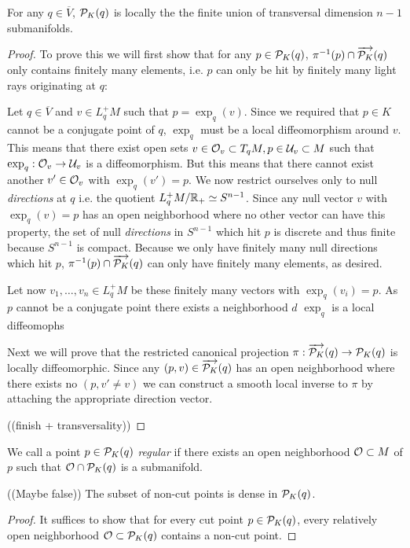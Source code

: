 \begin{proposition}
For any $q\in \overline{V}$, $\mathcal{P}_K(q)$ is locally the the finite union of transversal dimension $n-1$ submanifolds.
\end{proposition}
\begin{proof}
To prove this we will first show that for any $p\in \mathcal{P}_K(q)$, $\pi^{-1}(p)\cap \overrightarrow{\mathcal{P}_K}(q)$ only contains finitely many elements, i.e. $p$ can only be hit by finitely many light rays originating at $q$:

Let $q\in \overline{V}$ and $v\in L^+_qM$ such that $p=\exp_q(v)$. Since we required that $p\in K$ cannot be a conjugate point of $q$, $\exp_q$ must be a local diffeomorphism around $v$. This means that there exist open sets $v\in\mathcal{O}_v\subset T_qM, p\in \mathcal{U}_v\subset M$ such that $\exp_q:\mathcal{O}_v\to \mathcal{U}_v$ is a diffeomorphism. But this means that there cannot exist another $v'\in \mathcal{O}_v$ with $\exp_q(v')=p$. We now restrict ourselves only to null \emph{directions} at $q$ i.e. the quotient $L^+_qM/\mathbb{R}_+ \simeq S^{n-1}$. Since any null vector $v$ with $\exp_q(v)=p$ has an open neighborhood where no other vector can have this property, the set of null \emph{directions} in $S^{n-1}$ which hit $p$ is discrete and thus finite because $S^{n-1}$ is compact. Because we only have finitely many null directions which hit $p$, $\pi^{-1}(p)\cap \overrightarrow{\mathcal{P}_K}(q)$ can only have finitely many elements, as desired.

Let now $v_1,\dots,v_n\in L^+_qM$ be these finitely many vectors with $\exp_q(v_i)=p$. As $p$ cannot be a conjugate point there exists a neighborhood $d$
$\exp_q$ is a local diffeomophs

Next we will prove that the restricted canonical projection $\pi:\overrightarrow{\mathcal{P}_K}(q)\to \mathcal{P}_K(q)$ is locally diffeomorphic. Since any $(p,v)\in \overrightarrow{\mathcal{P}_K}(q)$ has an open neighborhood where there exists no $(p,v'\neq v)$ we can construct a smooth local inverse to $\pi$ by attaching the appropriate direction vector.

((finish + transversality))
\end{proof}

\begin{definition}
We call a point $p\in \mathcal{P}_K(q)$ \emph{regular} if there exists an open neighborhood $\mathcal{O}\subset M$ of $p$ such that $\mathcal{O}\cap \mathcal{P}_K(q)$ is a submanifold.
\end{definition}


\begin{corollary}((Maybe false)) The subset of non-cut points is dense in $\mathcal{P}_K(q)$.
\end{corollary}
\begin{proof}
It suffices to show that for every cut point $p\in \mathcal{P}_K(q)$, every relatively open neighborhood $\mathcal{O}\subset\mathcal{P}_K(q)$ contains a non-cut point.
\end{proof}



